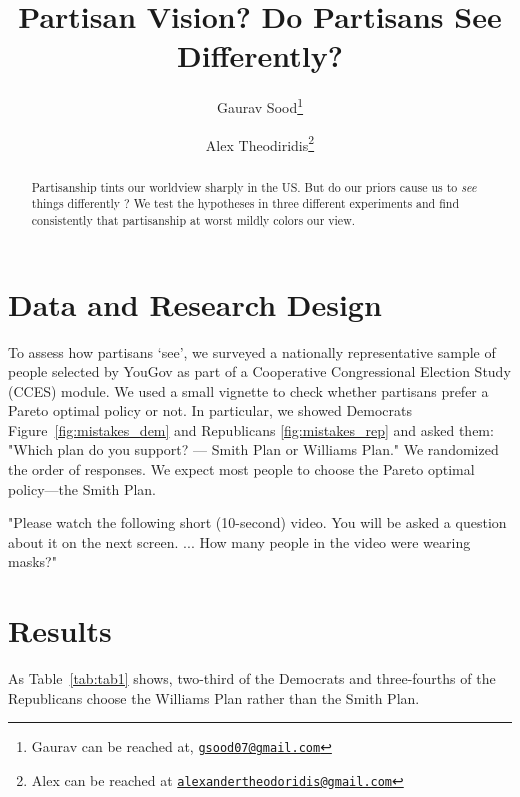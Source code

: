 \documentclass[12pt, letterpaper]{article}
\title{Partisan Vision? Do Partisans See Differently?}
\author{Gaurav Sood\thanks{Gaurav can be reached at, \href{mailto:gsood07@gmail.com}{\texttt{gsood07@gmail.com}}} \and Alex Theodiridis\thanks{Alex can be reached at \href{alexandertheodoridis@gmail.com}{\texttt{alexandertheodoridis@gmail.com}}}}
\begin{document}
\maketitle
\thispagestyle{empty}

\begin{abstract}

\noindent Partisanship tints our worldview sharply in the US. But do our priors cause us to \textit{see} things differently \citep{chabris2010invisible}? We test the hypotheses in three different experiments and find consistently that partisanship at worst mildly colors our view.

\end{abstract}

\newpage


\doublespacing


\section{Data and Research Design}

\citep{chabris2010invisible}

To assess how partisans `see', we surveyed a nationally representative sample of people selected by YouGov \citep{rivers2007} as part of a Cooperative Congressional Election Study (CCES) module. We used a small vignette to check whether partisans prefer a Pareto optimal policy or not. In particular, we showed Democrats Figure~\ref{fig:mistakes_dem} and Republicans \ref{fig:mistakes_rep} and asked them: "Which plan do you support? --- Smith Plan or Williams Plan." We randomized the order of responses. We expect most people to choose the Pareto optimal policy---the Smith Plan.

"Please watch the following short (10-second) video. You will be asked a question about it on the next screen. ... How many people in the video were wearing masks?"

\section{Results}

As Table~\ref{tab:tab1} shows, two-third of the Democrats and three-fourths of the Republicans choose the Williams Plan rather than the Smith Plan.




\end{document}
